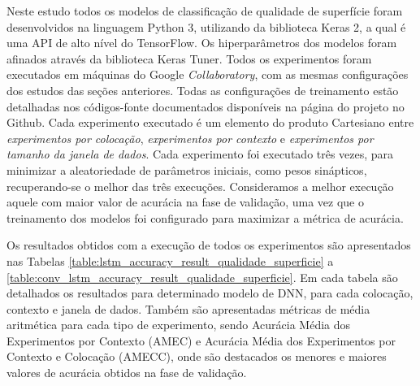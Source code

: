 Neste estudo todos os modelos de classificação de qualidade de superfície foram desenvolvidos na linguagem Python 3, utilizando da biblioteca Keras 2, a qual é uma API de alto nível do TensorFlow. Os hiperparâmetros dos modelos foram afinados através da biblioteca Keras Tuner. Todos os experimentos foram executados em máquinas do Google \textit{Collaboratory}, com as mesmas configurações dos estudos das seções anteriores. Todas as configurações de treinamento estão detalhadas nos códigos-fonte documentados disponíveis na página do projeto no Github. Cada experimento executado é um elemento do produto Cartesiano entre \emph{experimentos por colocação}, \emph{experimentos por contexto} e \emph{experimentos por tamanho da janela de dados}. Cada experimento foi executado três vezes, para minimizar a aleatoriedade de parâmetros iniciais, como pesos sinápticos, recuperando-se o melhor das três execuções. Consideramos a melhor execução aquele com maior valor de acurácia na fase de validação, uma vez que o treinamento dos modelos foi configurado para maximizar a métrica de acurácia.

Os resultados obtidos com a execução de todos os experimentos são apresentados nas Tabelas \ref{table:lstm_accuracy_result_qualidade_superficie} a \ref{table:conv_lstm_accuracy_result_qualidade_superficie}. Em cada tabela são detalhados os resultados para determinado modelo de DNN, para cada colocação, contexto e janela de dados. Também são apresentadas métricas de média aritmética para cada tipo de experimento, sendo Acurácia Média dos Experimentos por Contexto (AMEC) e Acurácia Média dos Experimentos por Contexto e Colocação (AMECC), onde são destacados os menores e maiores valores de acurácia obtidos na fase de validação.

